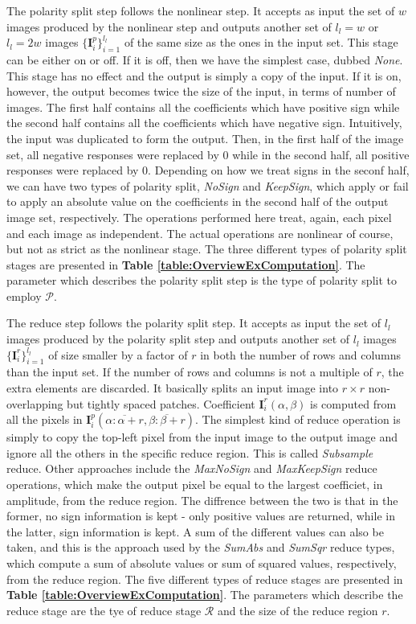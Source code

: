\documentclass[12pt,a4paper,oneside,english]{UPBThesis}
\newcommand{\hctimes}[2]{{#1}\!\times\!{#2}}
\newcommand{\hcrange}[2]{\overline{{#1}\colon\!\!{#2}}}
\begin{document}
The polarity split step follows the nonlinear step. It accepts as input the set of $w$ images produced by the nonlinear step and outputs another set of $l_l=w$ or $l_l=2w$ images $\{\textbf{I}_i^p\}_{i=1}^{l_l}$ of the same size as the ones in the input set. This stage can be either on or off. If it is off, then we have the simplest case, dubbed \emph{None}. This stage has no effect and the output is simply a copy of the input. If it is on, however, the output becomes twice the size of the input, in terms of number of images. The first half contains all the coefficients which have positive sign while the second half contains all the coefficients which have negative sign. Intuitively, the input was duplicated to form the output. Then, in the first half of the image set, all negative responses were replaced by $0$ while in the second half, all positive responses were replaced by $0$. Depending on how we treat signs in the seconf half, we can have two types of polarity split, \emph{NoSign} and \emph{KeepSign}, which apply or fail to apply an absolute value on the coefficients in the second half of the output image set, respectively. The operations performed here treat, again, each pixel and each image as independent. The actual operations are nonlinear of course, but not as strict as the nonlinear stage. The three different types of polarity split stages are presented in \textbf{Table \ref{table:OverviewExComputation}}. The parameter which describes the polarity split step is the type of polarity split to employ $\mathcal{P}$.

The reduce step follows the polarity split step. It accepts as input the set of $l_l$ images produced by the polarity split step and outputs another set of $l_l$ images $\{\textbf{I}_i^r\}_{i=1}^{l_l}$ of size smaller by a factor of $r$ in both the number of rows and columns than the input set. If the number of rows and columns is not a multiple of $r$, the extra elements are discarded. It basically splits an input image into $\hctimes{r}{r}$ non-overlapping but tightly spaced patches. Coefficient $\textbf{I}_i^r(\alpha,\beta)$ is computed from all the pixels in $\textbf{I}_i^p(\hcrange{\alpha}{\alpha+r},\hcrange{\beta}{\beta+r})$. The simplest kind of reduce operation is simply to copy the top-left pixel from the input image to the output image and ignore all the others in the specific reduce region. This is called \emph{Subsample} reduce. Other approaches include the \emph{MaxNoSign} and \emph{MaxKeepSign} reduce operations, which make the output pixel be equal to the largest coefficiet, in amplitude, from the reduce region. The diffrence between the two is that in the former, no sign information is kept - only positive values are returned, while in the latter, sign information is kept. A sum of the different values can also be taken, and this is the approach used by the \emph{SumAbs} and \emph{SumSqr} reduce types, which compute a sum of absolute values or sum of squared values, respectively, from the reduce region. The five different types of reduce stages are presented in \textbf{Table \ref{table:OverviewExComputation}}. The parameters which describe the reduce stage are the tye of reduce stage $\mathcal{R}$ and the size of the reduce region $r$.
\end{document}
